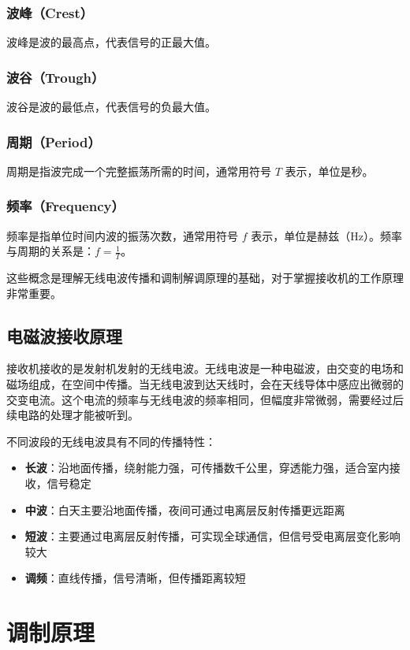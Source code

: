 \documentclass[12pt,UTF8]{ctexbook}
\begin{document}
\subsubsection{波峰（Crest）}
波峰是波的最高点，代表信号的正最大值。

\subsubsection{波谷（Trough）}
波谷是波的最低点，代表信号的负最大值。

\subsubsection{周期（Period）}
周期是指波完成一个完整振荡所需的时间，通常用符号 $T$ 表示，单位是秒。

\subsubsection{频率（Frequency）}
频率是指单位时间内波的振荡次数，通常用符号 $f$ 表示，单位是赫兹（Hz）。频率与周期的关系是：$f = \frac{1}{T}$。

这些概念是理解无线电波传播和调制解调原理的基础，对于掌握接收机的工作原理非常重要。

\subsection{电磁波接收原理}

接收机接收的是发射机发射的无线电波。无线电波是一种电磁波，由交变的电场和磁场组成，在空间中传播。当无线电波到达天线时，会在天线导体中感应出微弱的交变电流。这个电流的频率与无线电波的频率相同，但幅度非常微弱，需要经过后续电路的处理才能被听到。

不同波段的无线电波具有不同的传播特性：
\begin{itemize}[leftmargin=3.5em]
    \item \textbf{长波}：沿地面传播，绕射能力强，可传播数千公里，穿透能力强，适合室内接收，信号稳定
    \item \textbf{中波}：白天主要沿地面传播，夜间可通过电离层反射传播更远距离
    \item \textbf{短波}：主要通过电离层反射传播，可实现全球通信，但信号受电离层变化影响较大
    \item \textbf{调频}：直线传播，信号清晰，但传播距离较短
\end{itemize}

\section{调制原理}
\end{document}
